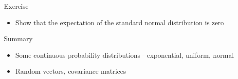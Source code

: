\documentclass{beamer}
\begin{document}
\begin{frame}{Exercise}  
\begin{itemize} 
 \item Show that the expectation of the standard normal distribution is zero 
\end{itemize}
\end{frame}


\begin{frame}{Summary}  
\begin{itemize} 
 \item Some continuous probability distributions - exponential, uniform, normal 
 \item Random vectors, covariance matrices
\end{itemize}
\end{frame}
\end{document}
